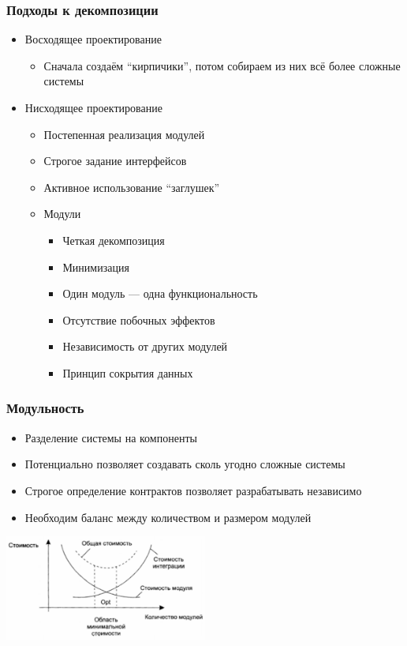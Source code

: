 \documentclass[xetex,mathserif,serif]{beamer}
\begin{document}
    \begin{frame}
        \frametitle{Подходы к декомпозиции}
        \begin{itemize}
            \item Восходящее проектирование
            \begin{itemize}
                \item Сначала создаём ``кирпичики'', потом собираем из них всё более сложные системы
            \end{itemize}
            \item Нисходящее проектирование
            \begin{itemize}
                \item Постепенная реализация модулей
                \item Строгое задание интерфейсов
                \item Активное использование ``заглушек''
                \item Модули
                \begin{itemize}
                    \item Четкая декомпозиция
                    \item Минимизация
                    \item Один модуль --- одна функциональность
                    \item Отсутствие побочных эффектов
                    \item Независимость от других модулей
                    \item Принцип сокрытия данных
                \end{itemize}
            \end{itemize}
        \end{itemize}
    \end{frame}
    
    \begin{frame}
        \frametitle{Модульность}
        \begin{itemize}
            \item Разделение системы на компоненты
            \item Потенциально позволяет создавать сколь угодно сложные системы
            \item Строгое определение контрактов позволяет разрабатывать независимо
            \item Необходим баланс между количеством и размером модулей
        \end{itemize}
        \vskip 1cm
        \begin{center}
            \includegraphics[width=0.5\textwidth]{modulesCost.png}
        \end{center}
    \end{frame}
\end{document}
